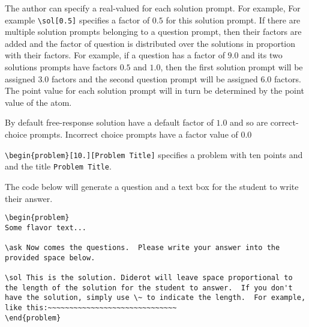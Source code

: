 \begin{cluster}
\label{grp:grm:quiz::solution-factors}

\begin{gram}
\label{grm:quiz::solution-factors}
The author can specify a real-valued  for each solution prompt.  For
example, For example \lstinline`\sol[0.5]` specifies a factor of $0.5$
for this solution prompt. If there are multiple solution prompts
belonging to a question prompt, then their factors are added and the
factor of question is distributed over the solutions in proportion
with their factors.  For example, if a question has a factor of $9.0$
and its two solutions prompts have factors $0.5$ and $1.0$, then
the first solution prompt will be assigned $3.0$ factors and the second question
prompt will be assigned $6.0$ factors.  The point value  for each solution prompt will in turn be determined by the point value of the atom.

By default free-response solution have a default factor of $1.0$ and
so are correct-choice prompts.  Incorrect choice prompts have a factor value of $0.0$

\end{gram}
\end{cluster}

\begin{cluster}
\label{grp:grm:quiz::title}

\begin{gram}
\label{grm:quiz::title}
\lstinline`\begin{problem}[10.][Problem Title]` specifies a  problem with ten points and and the title
\lstinline`Problem Title`.

\end{gram}
\end{cluster}

\begin{cluster}
\label{grp:xmpl:quiz::free-response-with-a-single-solution}

\begin{example}
\label{xmpl:quiz::free-response-with-a-single-solution}
The code below will generate a question and a text box for the student
to write their answer.

\begin{lstlisting}
\begin{problem}
Some flavor text...

\ask Now comes the questions.  Please write your answer into the
provided space below.

\sol This is the solution. Diderot will leave space proportional to
the length of the solution for the student to answer.  If you don't
have the solution, simply use \~ to indicate the length.  For example,
like this:~~~~~~~~~~~~~~~~~~~~~~~~~~~~~~
\end{problem}
\end{lstlisting}

\end{example}
\end{cluster}

